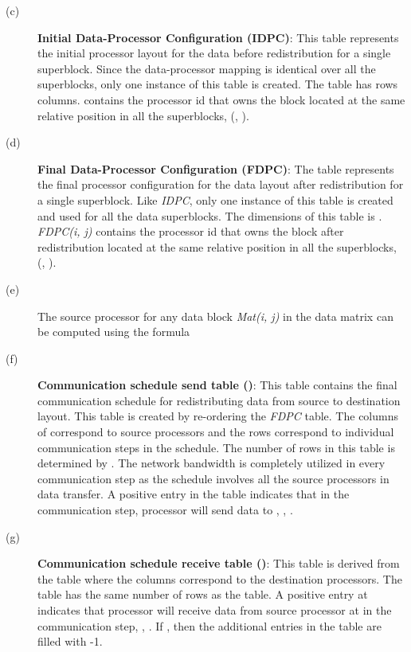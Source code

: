 \documentclass[letterpaper]{llncs}
\begin{document}
\begin{description}
\item[(c)] \textbf{Initial Data-Processor Configuration (IDPC)}: This table represents the initial processor layout for the 
data before redistribution for a single superblock. Since the data-processor mapping is identical over all the superblocks, 
only one instance of this table is created. The table has  rows  columns.
 contains the processor id  that owns the block  located at the same relative position in all the superblocks, 
(, ).

\item[(d)] \textbf{Final Data-Processor Configuration (FDPC)}: The table represents the final processor configuration for 
the data layout after redistribution for a single super\-block. Like \textit{IDPC}, only one instance of this table is 
created and used for all the data superblocks. The dimensions of this table is . \textit{FDPC(i, j)} contains the processor 
id  that owns the block  after redistribution located at the same relative position in all the superblocks,
(, ).

\item[(e)]The source processor for any data block \textit{Mat(i, j)} in the data matrix can be computed using the formula


\hspace{1.3in}

\item[(f)] \textbf{Communication schedule send table ()}: This table contains the final communication schedule for redistributing 
data from source to destination layout.  This table is created by re-ordering the \textit{FDPC} table. 
The columns of  correspond to  source processors and the rows correspond to individual 
communication steps in the schedule.
The number of rows in this table is determined by . 
The network bandwidth is completely utilized in every communication step as the schedule
involves all the source processors in data transfer. A positive entry in the  table
indicates that in the  communication step, processor  will send data to , 
, .

\item[(g)] \textbf{Communication schedule receive table ()}: This table is derived from the  table where the 
columns correspond to the destination processors. The table has the same number of rows as the  table.  
A positive entry at  indicates that processor  will receive data 
from source processor at  in the  communication step, , . 
If , 
then the additional entries in the  table are filled with -1.

\end{description}
\end{document}
